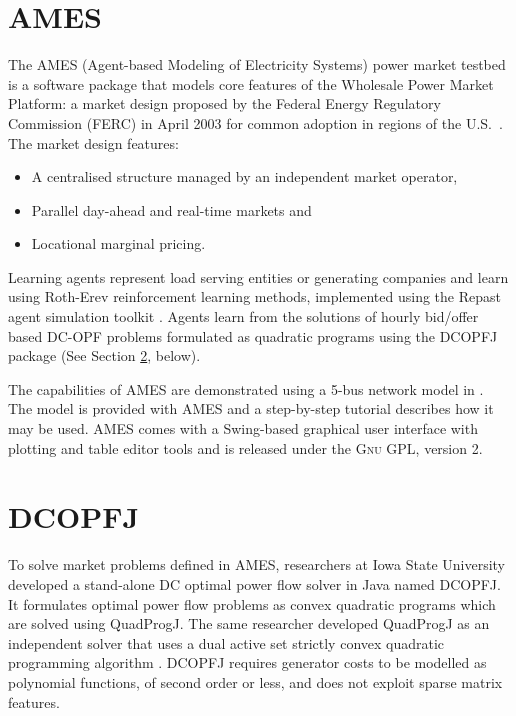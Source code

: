 \section{AMES}
\label{sec:ames}
The AMES (Agent-based Modeling of Electricity Systems) power market testbed is
a software package that models core features of the Wholesale Power Market
Platform: a market design proposed by the Federal Energy Regulatory
Commission (FERC) in April 2003 for common adoption in regions of the
U.S.~\cite{tesfatsi:wpmp}. The market design features:
\begin{itemize}
  \item A centralised structure managed by an independent market operator,
  \item Parallel day-ahead and real-time markets and
  \item Locational marginal pricing.
\end{itemize}
Learning agents represent load serving entities or generating companies and
learn using Roth-Erev reinforcement learning methods,
implemented using the Repast agent simulation toolkit \cite{gieseler:thesis}.
Agents learn from the solutions of hourly bid/offer based
DC-OPF problems formulated as quadratic programs using the DCOPFJ package
\cite{tesfatsi:dcopf} (See Section \ref{sec:dcopfj}, below).

The capabilities of AMES are demonstrated using a 5-bus network model in
.  The model is provided with AMES and a step-by-step
tutorial describes how it may be used.  AMES comes with a
Swing-based graphical user interface with plotting and table editor tools and
is released under the \textsc{Gnu} GPL, version 2.

\section{DCOPFJ}
\label{sec:dcopfj}
To solve market problems defined in AMES, researchers at Iowa State University
developed a stand-alone DC optimal power flow solver in Java named DCOPFJ.
It formulates optimal power flow problems as convex quadratic programs
which are solved using QuadProgJ.  The same researcher developed QuadProgJ as
an independent solver that uses a dual active set strictly convex quadratic
programming algorithm \cite{goldfarb:scqp}.  DCOPFJ requires
generator costs to be modelled as polynomial functions, of second order or
less, and does not exploit sparse matrix features.

